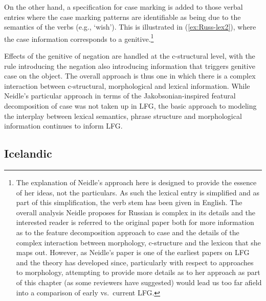 \documentclass[output=paper,hidelinks]{langscibook}
\begin{document}
On the other hand, a specification for case marking is added  to those verbal
entries where the case marking patterns are identifiable as being due to the
semantics of the verbs (e.g., `wish').  This is illustrated in
(\ref{ex:Russ-lex2}), where the  case information corresponds to a
genitive.\footnote{The explanation of Neidle's approach here is
  designed to provide  the essence of her ideas, not the particulars.  As
  such the lexical entry is simplified and as part of this simplification, the
  verb stem has been given in English.  The overall analysis Neidle proposes for
  Russian is complex in its details and the interested reader is referred to the
  original paper both for more information as to the feature decomposition
  approach to case and the details of the complex interaction between
  morphology, c-structure and the lexicon that she maps out. However, as
  Neidle's paper is one of the earliest papers on LFG and the theory has
  developed since, particularly with respect to approaches to morphology,
  attempting to provide more details as to her approach as part of this chapter (as some reviewers have
  suggested) would lead us too far afield into a comparison of early vs.~current
  LFG.}\ 

\ea \label{ex:Russ-lex2}
\z


Effects of the genitive of negation are  handled at the
c-structural level, with the rule introducing the negation also introducing
information that triggers genitive case on the object.  The overall approach is
thus one in which there is a complex interaction between c-structural,
morphological and lexical information.  While Neidle's particular approach in
terms of the Jakobsonian-inspired featural decomposition of case was
not taken up in LFG, the basic approach to modeling the interplay between
lexical semantics, phrase structure and morphological information continues to
inform   LFG. 

\subsection{Icelandic}
\end{document}
